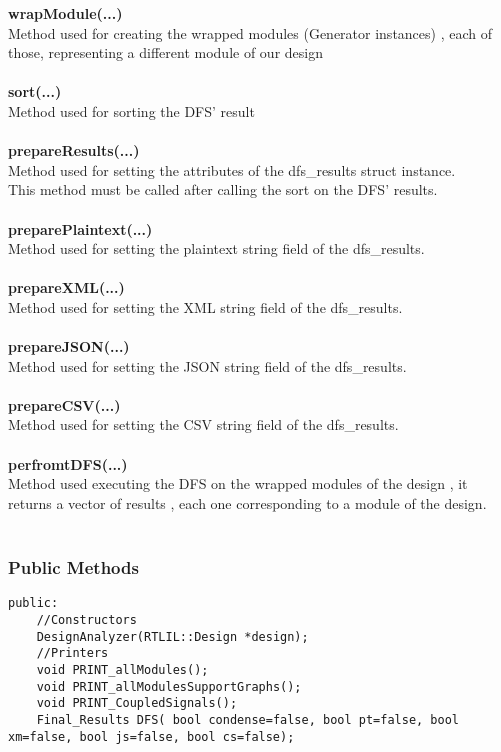 \documentclass{article}
\begin{document}
\textbf{wrapModule(...)}\\
Method used for creating the wrapped modules (Generator instances) , each of those, representing a different module of our design\\\\

\textbf{sort(...)}\\
Method used for sorting the DFS' result\\\\

\textbf{prepareResults(...)}\\
Method used for setting the attributes of the dfs\_results struct instance.\\
This method must be called after calling the sort on the DFS' results.\\\\

\textbf{preparePlaintext(...)}\\
Method used for setting the plaintext string field of the dfs\_results.\\\\

\textbf{prepareXML(...)}\\
Method used for setting the XML string field of the dfs\_results.\\\\

\textbf{prepareJSON(...)}\\
Method used for setting the JSON string field of the dfs\_results.\\\\

\textbf{prepareCSV(...)}\\
Method used for setting the CSV string field of the dfs\_results.\\\\

\textbf{perfromtDFS(...)}\\
Method used executing the DFS on the wrapped modules of the design , it returns a vector of results , each one corresponding to a module of the design.\\\\

\subsubsection{Public Methods}

\begin{mdframed}[hidealllines=true, backgroundcolor=magenta!10]
	\begin{lstlisting}[basicstyle=\tiny]
	public:
	//Constructors
	DesignAnalyzer(RTLIL::Design *design);
	//Printers
	void PRINT_allModules();
	void PRINT_allModulesSupportGraphs();
	void PRINT_CoupledSignals();
	Final_Results DFS( bool condense=false, bool pt=false, bool xm=false, bool js=false, bool cs=false);
	\end{lstlisting}
\end{mdframed}
\end{document}
